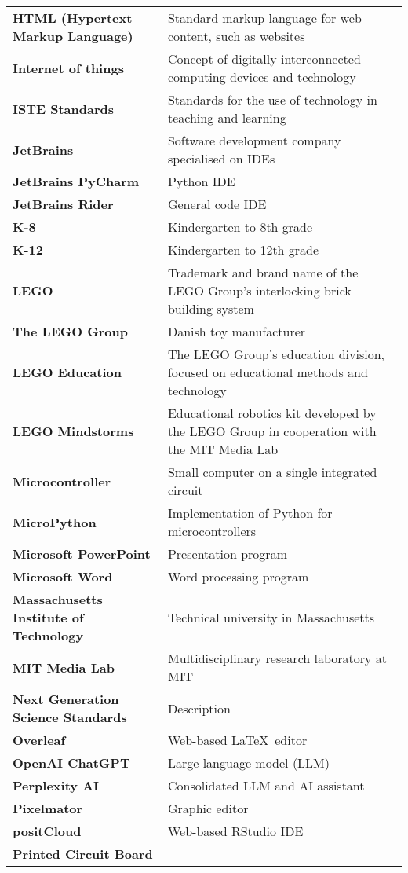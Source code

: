 {\begin{longtable}{>{\raggedright \bfseries}p{} p{}}
HTML (Hypertext \quad \quad \quad Markup Language)& Standard markup language for web content, such as websites \\
Internet of things  & Concept of digitally interconnected computing devices and technology \\
ISTE Standards      & Standards for the use of technology in teaching and learning \\
JetBrains           & Software development company specialised on IDEs \\
JetBrains PyCharm   & Python IDE \\
JetBrains Rider     & General code IDE \\
K-8                 & Kindergarten to 8th grade \\
K-12                & Kindergarten to 12th grade \\
LEGO                & Trademark and brand name of the LEGO Group's interlocking brick building system \\
The LEGO Group      & Danish toy manufacturer \\
LEGO Education      & The LEGO Group's education division, focused on educational methods and technology \\
LEGO Mindstorms     & Educational robotics kit developed by the LEGO Group in cooperation with the MIT Media Lab \\
Microcontroller     & Small computer on a single integrated circuit \\
MicroPython         & Implementation of Python for microcontrollers \\
Microsoft PowerPoint& Presentation program \\
Microsoft Word      & Word processing program \\
Massachusetts Institute of Technology & Technical university in Massachusetts \\
MIT Media Lab       & Multidisciplinary research laboratory at MIT \\
Next Generation Science Standards & Description \\
Overleaf            & Web-based \LaTeX\ editor  \\
OpenAI ChatGPT      & Large language model (LLM) \\
Perplexity AI       & Consolidated LLM and AI assistant  \\
Pixelmator          & Graphic editor \\
positCloud          & Web-based RStudio IDE \\
Printed Circuit Board&  \\

\end{longtable}}
